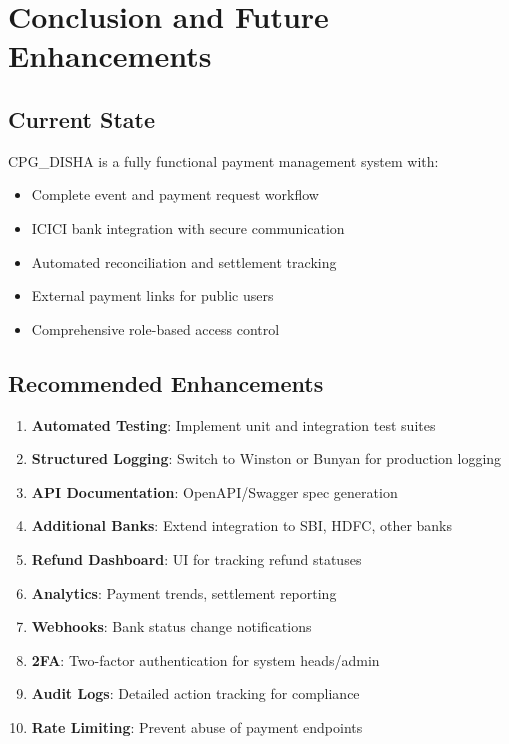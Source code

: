 \documentclass[12pt,a4paper]{article}
\begin{document}
\section{Conclusion and Future Enhancements}

\subsection{Current State}
CPG\_DISHA is a fully functional payment management system with:
\begin{itemize}
  \item Complete event and payment request workflow
  \item ICICI bank integration with secure communication
  \item Automated reconciliation and settlement tracking
  \item External payment links for public users
  \item Comprehensive role-based access control
\end{itemize}

\subsection{Recommended Enhancements}
\begin{enumerate}
  \item \textbf{Automated Testing}: Implement unit and integration test suites
  \item \textbf{Structured Logging}: Switch to Winston or Bunyan for production logging
  \item \textbf{API Documentation}: OpenAPI/Swagger spec generation
  \item \textbf{Additional Banks}: Extend integration to SBI, HDFC, other banks
  \item \textbf{Refund Dashboard}: UI for tracking refund statuses
  \item \textbf{Analytics}: Payment trends, settlement reporting
  \item \textbf{Webhooks}: Bank status change notifications
  \item \textbf{2FA}: Two-factor authentication for system heads/admin
  \item \textbf{Audit Logs}: Detailed action tracking for compliance
  \item \textbf{Rate Limiting}: Prevent abuse of payment endpoints
\end{enumerate}
\end{document}
